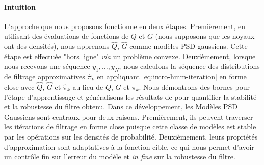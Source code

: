 \paragraph{Intuition}
L'approche que nous proposons fonctionne en deux étapes. Premièrement, en utilisant des évaluations de fonctions de $Q$ et $G$ (nous supposons que les noyaux ont des densités), nous apprenons $\hat Q$, $\hat G$ comme modèles PSD gaussiens. Cette étape est effectuée "hors ligne" \emph{via} un problème convexe. Deuxièmement, lorsque nous recevons une séquence $y_1, \ldots, y_N$, nous calculons la séquence des distributions de filtrage approximatives $\hat\pi_k$ en appliquant \cref{eq:intro-hmm-iteration} en forme close avec $\hat Q$, $\hat G$ et $\hat \pi_k$ au lieu de $Q$, $G$ et $\pi_k$.
Nous démontrons des bornes pour l'étape d'apprentissage et généralisons les résultats de \cite{oudjane} pour quantifier la stabilité et la robustesse du filtre obtenu.
Dans ce développement, les Modèles PSD Gaussiens sont centraux pour deux raisons. Premièrement, ils peuvent traverser les itérations de filtrage en forme close puisque cette classe de modèles est stable par les opérations sur les densités de probabilité. Deuxièmement, leurs propriétés d'approximation sont adaptatives à la fonction cible, ce qui nous permet d'avoir un contrôle fin sur l'erreur du modèle et \emph{in fine} sur la robustesse du filtre.

